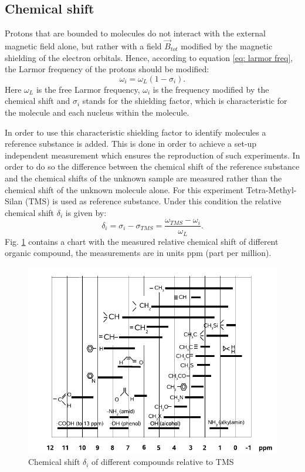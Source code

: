 \subsection{Chemical shift}
Protons that are bounded to molecules do not interact with the external magnetic field alone, but rather with a field $\vec{B}_{tot}$ modified by the magnetic shielding of the electron orbitals. Hence, according to equation \ref{eq: larmor freq}, the Larmor frequency of the protons should be modified:
\begin{equation}
\omega_i = \omega_L\left( 1 - \sigma_i\right).
\end{equation}
Here $\omega_L$ is the free Larmor frequency, $\omega_i$ is the frequency modified by the chemical shift and $\sigma_i$ stands for the shielding factor, which is characteristic for the molecule and each nucleus within the molecule.

In order to use this characteristic shielding factor to identify molecules a reference substance is added. This is done in order to achieve a set-up independent measurement which ensures the reproduction of such experiments. In order to do so the difference between the chemical shift of the reference substance and the chemical shifts of the unknown sample are measured rather than the chemical shift of the unknown molecule alone. For this experiment Tetra-Methyl-Silan (TMS) is used as reference substance. Under this condition the relative chemical shift $\delta_i$ is given by:
\begin{equation}
\delta_i = \sigma_i - \sigma_{TMS} = \frac{\omega_{TMS} - \omega_i}{\omega_L}.
\end{equation}
 Fig. \ref{fig: chemical shift} contains a chart with the measured relative chemical shift of different organic compound, the measurements are in units ppm (part per million).
\begin{figure}[!htbp]
 \begin{center}
  \includegraphics[width = .6\textwidth]{Latex images/chemical-shift.png}
  \caption[]{Chemical shift $\delta_i$ of different compounds relative to TMS \footnotemark}
    \label{fig: chemical shift}
 \end{center}
\end{figure}
